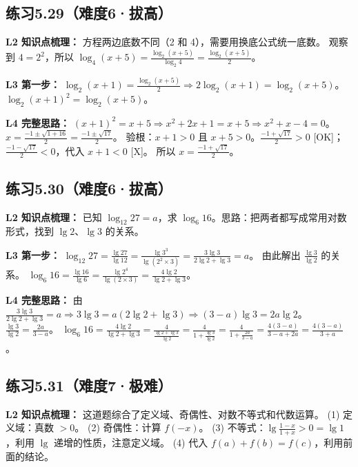 \subsection*{练习5.29（难度6·拔高）}

\textbf{L2 知识点梳理：}
方程两边底数不同（2 和 4），需要用换底公式统一底数。
观察到 \(4 = 2^2\)，所以 \(\log_4(x+5) = \frac{\log_2(x+5)}{\log_2 4} = \frac{\log_2(x+5)}{2}\)。

\textbf{L3 第一步：}
\(\log_2(x+1) = \frac{\log_2(x+5)}{2} \Rightarrow 2\log_2(x+1) = \log_2(x+5)\)。
\(\log_2(x+1)^2 = \log_2(x+5)\)。

\textbf{L4 完整思路：}
\((x+1)^2 = x+5 \Rightarrow x^2 + 2x + 1 = x + 5 \Rightarrow x^2 + x - 4 = 0\)。
\(x = \frac{-1 \pm \sqrt{1+16}}{2} = \frac{-1 \pm \sqrt{17}}{2}\)。
验根：\(x+1 > 0\) 且 \(x+5 > 0\)。\(\frac{-1+\sqrt{17}}{2} > 0\) [OK]；\(\frac{-1-\sqrt{17}}{2} < 0\)，代入 \(x+1 < 0\) [X]。
所以 \(x = \frac{-1 + \sqrt{17}}{2}\)。

\subsection*{练习5.30（难度6·拔高）}

\textbf{L2 知识点梳理：}
已知 \(\log_{12} 27 = a\)，求 \(\log_6 16\)。思路：把两者都写成常用对数形式，找到 \(\lg 2\)、\(\lg 3\) 的关系。

\textbf{L3 第一步：}
\(\log_{12} 27 = \frac{\lg 27}{\lg 12} = \frac{\lg 3^3}{\lg(2^2 \times 3)} = \frac{3\lg 3}{2\lg 2 + \lg 3} = a\)。
由此解出 \(\frac{\lg 3}{\lg 2}\) 的关系。
\(\log_6 16 = \frac{\lg 16}{\lg 6} = \frac{\lg 2^4}{\lg(2 \times 3)} = \frac{4\lg 2}{\lg 2 + \lg 3}\)。

\textbf{L4 完整思路：}
由 \(\frac{3\lg 3}{2\lg 2 + \lg 3} = a \Rightarrow 3\lg 3 = a(2\lg 2 + \lg 3) \Rightarrow (3-a)\lg 3 = 2a\lg 2\)。
\(\frac{\lg 3}{\lg 2} = \frac{2a}{3-a}\)。
\(\log_6 16 = \frac{4\lg 2}{\lg 2 + \lg 3} = \frac{4}{\frac{\lg 2 + \lg 3}{\lg 2}} = \frac{4}{1 + \frac{\lg 3}{\lg 2}} = \frac{4}{1 + \frac{2a}{3-a}} = \frac{4(3-a)}{3-a+2a} = \frac{4(3-a)}{3+a}\)。

\subsection*{练习5.31（难度7·极难）}

\textbf{L2 知识点梳理：}
这道题综合了定义域、奇偶性、对数不等式和代数运算。
(1) 定义域：真数 \(> 0\)。
(2) 奇偶性：计算 \(f(-x)\)。
(3) 不等式：\(\lg\frac{1-x}{1+x} > 0 = \lg 1\)，利用 \(\lg\) 递增的性质，注意定义域。
(4) 代入 \(f(a)+f(b) = f(c)\)，利用前面的结论。

